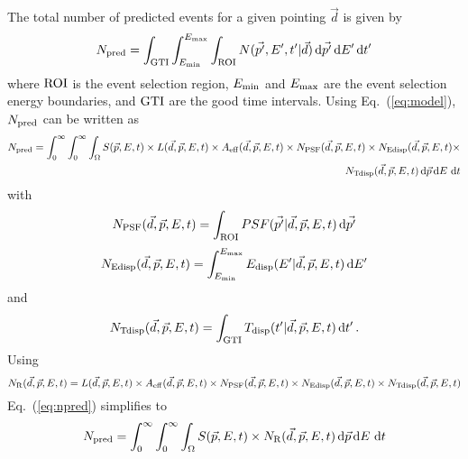 \documentclass{article}[12pt,a4]
\begin{document}
The total number of predicted events for a given pointing $\vec{d}$ is given by
\begin{equation}
N_{\rm pred} = \int_{\rm GTI} \int_{E_{\rm min}}^{E_{\rm max}} \int_{\rm ROI} 
N(\vec{p'}, E', t' | \vec{d}) \, {\rm d}\vec{p'} \, {\rm d}E' \,{\rm d}t'
\end{equation}
where
${\rm ROI}$ is the event selection region,
$E_{\rm min}$ and $E_{\rm max}$ are the event selection energy boundaries, and
${\rm GTI}$ are the good time intervals.
Using Eq.~(\ref{eq:model}), $N_{\rm pred}$ can be written as
\begin{eqnarray}
N_{\rm pred} = \int_{0}^{\infty} \int_{0}^{\infty} \int_{\Omega} 
S(\vec{p}, E, t) \times 
L(\vec{d}, \vec{p}, E, t) \times
A_{\rm eff}(\vec{d}, \vec{p}, E, t) \times
N_{\rm PSF}(\vec{d}, \vec{p}, E, t) \times
N_{\rm Edisp}(\vec{d}, \vec{p}, E, t) \times \nonumber \\
N_{\rm Tdisp}(\vec{d}, \vec{p}, E, t) 
\, {\rm d}\vec{p} \, {\rm d}E \, \,{\rm d}t
\label{eq:npred}
\end{eqnarray}
with
\begin{equation}
N_{\rm PSF}(\vec{d}, \vec{p}, E, t) = \int_{\rm ROI} PSF(\vec{p'} | \vec{d}, \vec{p}, E, t) \, {\rm d}\vec{p'}
\end{equation}
\begin{equation}
N_{\rm Edisp}(\vec{d}, \vec{p}, E, t) = \int_{E_{\rm min}}^{E_{\rm max}} 
E_{\rm disp}(E' | \vec{d}, \vec{p}, E, t) \, {\rm d}E'
\end{equation}
and
\begin{equation}
N_{\rm Tdisp}(\vec{d}, \vec{p}, E, t) = \int_{\rm GTI} T_{\rm disp}(t' | \vec{d}, \vec{p}, E, t) \, {\rm d}t' \, .
\end{equation}
Using
\begin{equation}
N_{\rm R}(\vec{d}, \vec{p}, E, t) = 
L(\vec{d}, \vec{p}, E, t) \times
A_{\rm eff}(\vec{d}, \vec{p}, E, t) \times
N_{\rm PSF}(\vec{d}, \vec{p}, E, t) \times
N_{\rm Edisp}(\vec{d}, \vec{p}, E, t) \times
N_{\rm Tdisp}(\vec{d}, \vec{p}, E, t)
\end{equation}
Eq.~(\ref{eq:npred}) simplifies to
\begin{equation}
N_{\rm pred} = \int_{0}^{\infty} \int_{0}^{\infty} \int_{\Omega} 
S(\vec{p}, E, t) \times 
N_{\rm R}(\vec{d}, \vec{p}, E, t)
\, {\rm d}\vec{p} \, {\rm d}E \, \,{\rm d}t
\end{equation}
\end{document}
